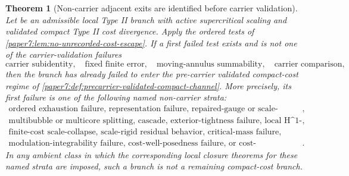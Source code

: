 \documentclass[11pt]{amsart}
\def\({}%
\def\){}%
\theoremstyle{plain}
\newtheorem{theorem}{Theorem}[section]
\theoremstyle{definition}
\theoremstyle{remark}
\begin{document}
\begin{theorem}[Non-carrier adjacent exits are identified before carrier validation]
\label{paper7:thm:noncarrier-exits-route}
Let \(\omega\) be an admissible local Type II branch with active supercritical
scaling and validated compact Type II cost divergence.  Apply the ordered tests
of \cref{paper7:lem:no-unrecorded-cost-escape}.  If a first failed test exists
and is not one of the carrier-validation failures
\[
  \text{carrier subidentity},\quad
  \text{fixed finite error},\quad
  \text{moving-annulus summability},\quad
  \text{carrier comparison},
\]
then the branch has already failed to enter the pre-carrier validated
compact-cost regime of
\cref{paper7:def:precarrier-validated-compact-channel}.  More precisely, its
first failure is one of the following named non-carrier strata:
\[
\begin{gathered}
\text{ordered exhaustion failure, representation failure, repaired-gauge or
scale-degeneracy failure},\\
\text{multibubble or multicore splitting, cascade, exterior-tightness failure,
local \(H^1\)-loss},\\
\text{finite-cost scale-collapse, scale-rigid residual behavior,
critical-mass failure},\\
\text{modulation-integrability failure, cost-well-posedness failure, or
cost-compatibility failure}.
\end{gathered}
\]
In any ambient class in which the corresponding local closure theorems for
these named strata are imposed, such a branch is not a remaining compact-cost
branch.
\end{theorem}
\end{document}
